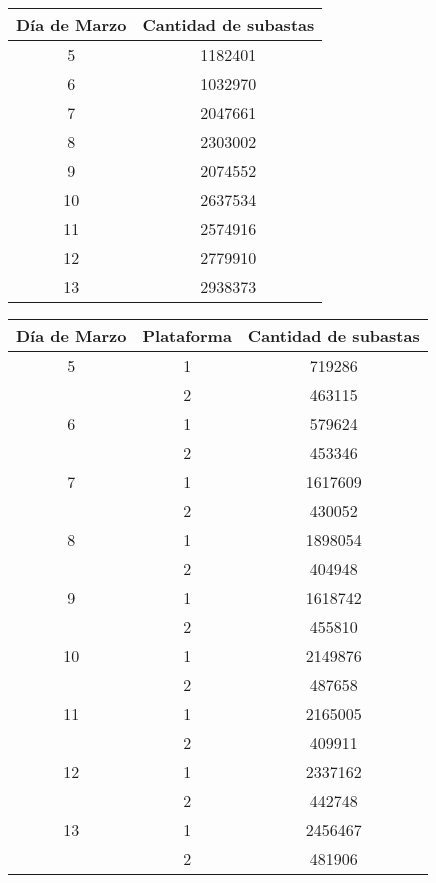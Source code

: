 \begin{center}
	\begin{tabular}{ |c|c| }
    	\hline
        Día de Marzo & Cantidad de subastas \\
        \hline\hline
		5 & 1182401\\
        \hline
       	6 & 1032970 \\
        \hline
        7 & 2047661 \\
        \hline
        8 & 2303002 \\
        \hline
        9 & 2074552\\
        \hline
       	10 & 2637534 \\
        \hline
        11 & 2574916 \\
        \hline
        12 & 2779910 \\
        \hline
        13 & 2938373\\
        \hline
	\end{tabular}
	

		
	\begin{tabular}{ |c|c|c| }
    	\hline
        Día de Marzo & Plataforma & Cantidad de subastas \\
        \hline\hline
		5	& 1 & 719286 \\
			& 2	& 463115 \\
        \hline
       	6	& 1 & 579624 \\
			& 2	& 453346 \\
        \hline
        7	& 1 & 1617609 \\
			& 2	& 430052 \\
        \hline
        8	& 1 & 1898054 \\
			& 2	& 404948 \\
        \hline
        9	& 1 & 1618742 \\
			& 2	& 455810 \\
        \hline
       	10	& 1 & 2149876 \\
			& 2	& 487658 \\
        \hline
       	11	& 1 & 2165005 \\
			& 2	& 409911 \\
        \hline
        12	& 1 & 2337162 \\
			& 2	& 442748 \\
		\hline
       	13	& 1 & 2456467 \\
			& 2	& 481906 \\
        \hline
	\end{tabular}
	

\end{center}
